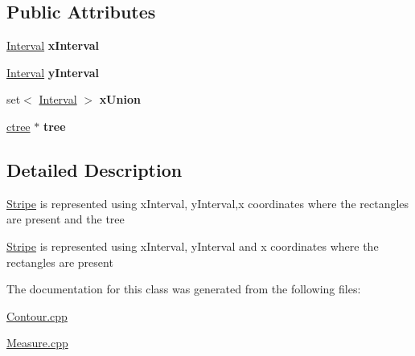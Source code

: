 \subsection*{Public Attributes}
\begin{DoxyCompactItemize}
\item 
\mbox{\label{classStripe_a59cfef264428dc338c2a57ce07d3f988}} 
\hyperlink{classInterval}{Interval} {\bfseries x\+Interval}
\item 
\mbox{\label{classStripe_a81c586918c348f569c5579595d69ce00}} 
\hyperlink{classInterval}{Interval} {\bfseries y\+Interval}
\item 
\mbox{\label{classStripe_a50aa656b460e5910d79883953d46b640}} 
set$<$ \hyperlink{classInterval}{Interval} $>$ {\bfseries x\+Union}
\item 
\mbox{\label{classStripe_a2ff57e842aad01b1c325d94adaf29564}} 
\hyperlink{structctree}{ctree} $\ast$ {\bfseries tree}
\end{DoxyCompactItemize}


\subsection{Detailed Description}
\hyperlink{classStripe}{Stripe} is represented using x\+Interval, y\+Interval,x coordinates where the rectangles are present and the tree

\hyperlink{classStripe}{Stripe} is represented using x\+Interval, y\+Interval and x coordinates where the rectangles are present 

The documentation for this class was generated from the following files\+:\begin{DoxyCompactItemize}
\item 
\hyperlink{Contour_8cpp}{Contour.\+cpp}\item 
\hyperlink{Measure_8cpp}{Measure.\+cpp}\end{DoxyCompactItemize}
